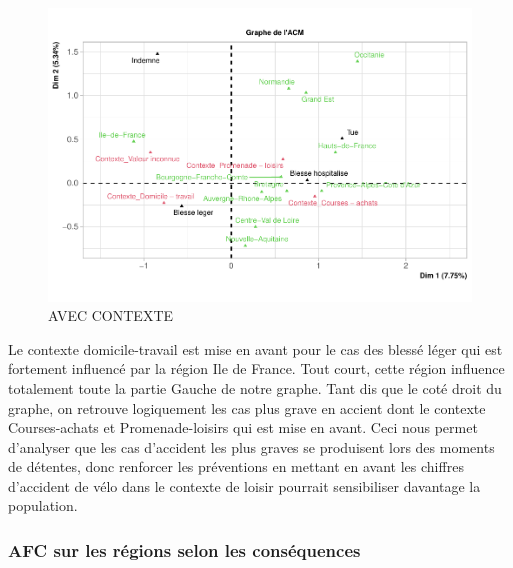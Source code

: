 \documentclass[french,]{compterendu}
\theoremstyle{urcastyle}
\theoremstyle{remark}
\begin{document}
\begin{figure}[H]

{\centering \includegraphics[width=0.9\linewidth]{Rapport_ADD_LEO-GABET_files/figure-latex/acm1modaCONTEXTE-1} 

}

\caption{AVEC CONTEXTE}\label{fig:acm1modaCONTEXTE}
\end{figure}

Le contexte domicile-travail est mise en avant pour le cas des blessé léger qui est fortement influencé par la région Ile de France. Tout court, cette région influence totalement toute la partie Gauche de notre graphe.
Tant dis que le coté droit du graphe, on retrouve logiquement les cas plus grave en accient dont le contexte Courses-achats et Promenade-loisirs qui est mise en avant.
Ceci nous permet d'analyser que les cas d'accident les plus graves se produisent lors des moments de détentes, donc renforcer les préventions en mettant en avant les chiffres d'accident de vélo dans le contexte de loisir pourrait sensibiliser davantage la population.

\hypertarget{afc-sur-les-ruxe9gions-selon-les-consuxe9quences}{%
\subsubsection{AFC sur les régions selon les conséquences}\label{afc-sur-les-ruxe9gions-selon-les-consuxe9quences}}
\end{document}

